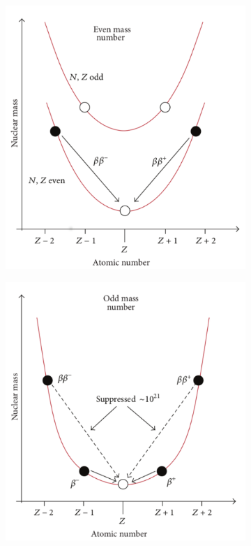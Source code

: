 \begin{figure}[h]
  \centering
  \begin{subfigure}[t]{0.48\textwidth}
    \centering
    \includegraphics[width=1\textwidth]{neutrinophysics/fig_neutrinophysics/2nu_even.pdf}
    \captionsetup{justification=justified}
    \caption{
      \label{subfig:}}
  \end{subfigure}
  \hfill
  \begin{subfigure}[t]{0.48\textwidth}
    \centering
    \includegraphics[width=1\textwidth]{neutrinophysics/fig_neutrinophysics/2nu_odd.pdf}

\end{subfigure}
\end{figure}
